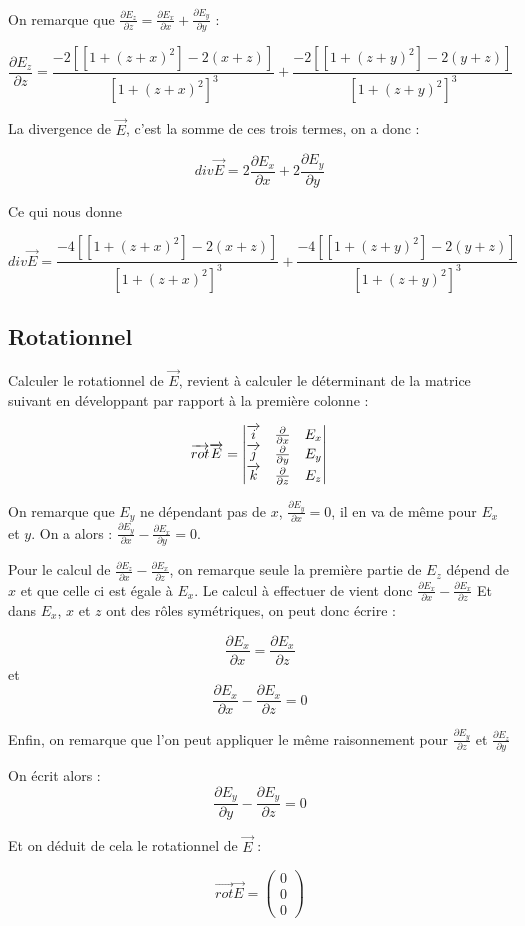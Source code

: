 \documentclass[a4paper, 11pt]{report} %
\newcommand{\vect}{\overrightarrow}
\begin{document}
On remarque que $\frac{\partial E_z}{\partial z} = \frac{\partial E_x}{\partial x} +\frac{\partial E_y}{\partial y}$ :

$$
    \frac{\partial E_z}{\partial z} = \frac{-2\left[\left[1+(z+x)^2\right]-2(x+z)\right]}{\left[1+(z+x)^2\right]^3} + \frac{-2\left[\left[1+(z+y)^2\right]-2(y+z)\right]}{\left[1+(z+y)^2\right]^3}
$$

La divergence de $\vect{E}$, c'est la somme de ces trois termes, on a donc :

$$div\vect{E} = 2\frac{\partial E_x}{\partial x} + 2\frac{\partial E_y}{\partial y}$$

Ce qui nous donne

$$
div\vect{E} = \frac{-4\left[\left[1+(z+x)^2\right]-2(x+z)\right]}{\left[1+(z+x)^2\right]^3} + \frac{-4\left[\left[1+(z+y)^2\right]-2(y+z)\right]}{\left[1+(z+y)^2\right]^3}
$$

\subsection{Rotationnel}

Calculer le rotationnel de $\vect{E}$, revient à calculer le déterminant de la matrice suivant en développant par
rapport à la première colonne :

$$
\vect{rot}\vect{E} =\begin{vmatrix}
                        \vect{i} & \frac{\partial}{\partial x} & E_x\\
                        \vect{j} & \frac{\partial}{\partial y} & E_y\\
                        \vect{k} & \frac{\partial}{\partial z} & E_z
                    \end{vmatrix}\\
$$

On remarque que $E_y$ ne dépendant pas de $x$, $\frac{\partial E_y}{\partial x} = 0$, il en va de même pour $E_x$ et
$y$.
On a alors : $\frac{\partial E_y}{\partial x} - \frac{\partial E_x}{\partial y} = 0$.


Pour le calcul de $\frac{\partial E_z}{\partial x} - \frac{\partial E_x}{\partial z}$, on remarque seule la première
partie de $E_z$ dépend de $x$ et que celle ci est égale à $E_x$. Le calcul à effectuer de vient donc $\frac{\partial
E_x}{\partial x} - \frac{\partial E_x}{\partial z}$ Et dans $E_x$, $x$ et $z$ ont des rôles symétriques, on peut donc
écrire :

$$
\frac{\partial E_x}{\partial x} = \frac{\partial E_x}{\partial z}
$$
et
$$
\frac{\partial E_x}{\partial x} - \frac{\partial E_x}{\partial z} = 0
$$

Enfin, on remarque que l'on peut appliquer le même raisonnement pour $\frac{\partial E_y}{\partial z}$ et
$\frac{\partial E_z}{\partial y}$

On écrit alors : 
$$
\frac{\partial E_y}{\partial y} - \frac{\partial E_y}{\partial z} = 0
$$

Et on déduit de cela le rotationnel de $\vect{E}$ :

$$\vect{rot}\vect{E} = \begin{pmatrix}0\\0\\0\end{pmatrix}$$

\end{document}
